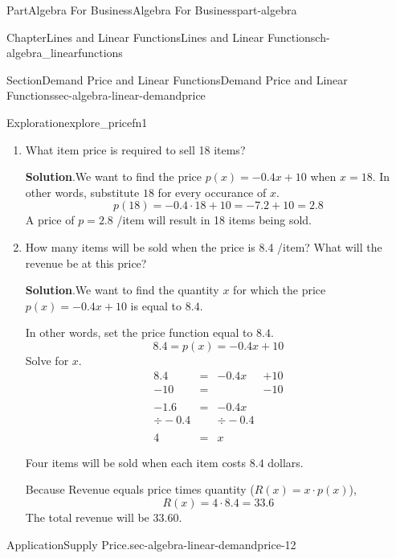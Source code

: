 \documentclass[oneside,10pt,]{tufte-book}
\newcommand{\blocktitlefont}{\relax}
\numberwithin{equation}{chapter}
\newcommand{\amp}{&}
\begin{document}
\begin{partptx}{Part}{Algebra For Business}{}{Algebra For Business}{}{}{part-algebra}
\begin{chapterptx}{Chapter}{Lines and Linear Functions}{}{Lines and Linear Functions}{}{}{ch-algebra_linearfunctions}
\begin{sectionptx}{Section}{Demand Price and Linear Functions}{}{Demand Price and Linear Functions}{}{}{sec-algebra-linear-demandprice}
\begin{exploration}{Exploration}{}{explore_pricefn1}
\begin{enumerate}[font=\bfseries,label=(\alph*),ref=\alph*]
\begin{equation*}
p(x) = -0.4 (x - 15) + 4
\end{equation*}
Simplifying this, we get%
\begin{equation*}
p(x) = -0.4x + 10
\end{equation*}
%
\item{}What item price is required to sell 18 items?%
\par\smallskip%
\noindent\textbf{\blocktitlefont Solution}.\hypertarget{explore_pricefn1-3-2}{}\quad{}We want to find the price \(p(x)=-0.4x+10\) when \(x=18\).  In other words, substitute \(18\) for every occurance of \(x\).%
\begin{equation*}
p(18) = -0.4\cdot 18 + 10 = -7.2 + 10 = 2.8
\end{equation*}
A price of \(p=2.8\) \textdollar{}\slash{}item will result in 18 items being sold.%
\item{}How many items will be sold when the price is 8.4 \textdollar{}\slash{}item?  What will the revenue be at this price?%
\par\smallskip%
\noindent\textbf{\blocktitlefont Solution}.\hypertarget{explore_pricefn1-4-2}{}\quad{}We want to find the quantity \(x\) for which the price \(p(x)=-0.4x+10\) is equal to \(8.4\).%
\par
In other words, set the price function equal to \(8.4\).%
\begin{equation*}
8.4 = p(x) = -0.4x + 10
\end{equation*}
Solve for \(x\).%
\begin{align*}
8.4 	\amp = \amp-0.4x \amp + 10\\
- 10 	\amp = \amp 	 \amp  -10\\
\amp \amp \amp \\
-1.6    \amp = \amp -0.4x \amp \\
\div -0.4 \amp \amp \div -0.4\\
\amp \amp \amp \\
4 \amp= \amp x \amp 
\end{align*}
%
\par
Four items will be sold when each item costs \(8.4\) dollars.%
\par
Because Revenue equals price times quantity (\(R(x) = x \cdot p(x)\)),%
\begin{equation*}
R(x) = 4 \cdot 8.4 = 33.6
\end{equation*}
The total revenue will be \textdollar{}33.60.%
\end{enumerate}%
\end{exploration}%
\begin{insight}{Application}{Supply Price.}{sec-algebra-linear-demandprice-12}%

\end{insight}
\end{sectionptx}
\end{chapterptx}
\end{partptx}
\end{document}
